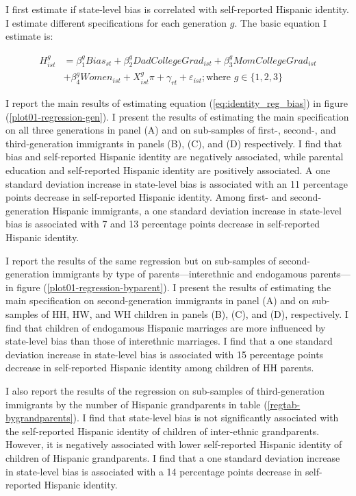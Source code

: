 \documentclass[12pt,english]{article}
\begin{document}
I first estimate if state-level bias is correlated with self-reported Hispanic identity. I estimate different specifications for each generation $g$. The basic equation I estimate is:
 
\begin{align}
H_{ist}^g &= \beta_1^g Bias_{st} + \beta_2^g DadCollegeGrad_{ist} + \beta_3^g MomCollegeGrad_{ist} \nonumber \\ 
            &+ \beta_4^g Women_{ist} + X_{ist}^g\pi + \gamma_{rt} 
           + \varepsilon_{ist}; 
           \text{where } g \in \{1,2,3\} \label{eq:identity_reg_bias}
\end{align}

I report the main results of estimating equation (\ref{eq:identity_reg_bias}) in figure (\ref{plot01-regression-gen}). I present the results of estimating the main specification on all three generations in panel (A) and on sub-samples of first-, second-, and third-generation immigrants in panels (B), (C), and (D) respectively. I find that bias and self-reported Hispanic identity are negatively associated, while parental education and self-reported Hispanic identity are positively associated. A one standard deviation increase in state-level bias is associated with an 11 percentage points decrease in self-reported Hispanic identity. Among first- and second-generation Hispanic immigrants, a one standard deviation increase in state-level bias is associated with 7 and 13 percentage points decrease in self-reported Hispanic identity.

I report the results of the same regression but on sub-samples of second-generation immigrants by type of parents---interethnic and endogamous parents---in figure (\ref{plot01-regression-byparent}). I present the results of estimating the main specification on second-generation immigrants in panel (A) and on sub-samples of HH, HW, and WH children in panels (B), (C), and (D), respectively. I find that children of endogamous Hispanic marriages are more influenced by state-level bias than those of interethnic marriages. I find that a one standard deviation increase in state-level bias is associated with 15 percentage points decrease in self-reported Hispanic identity among children of HH parents. 

I also report the results of the regression on sub-samples of third-generation immigrants by the number of Hispanic grandparents in table (\ref{regtab-bygrandparents}). I find that state-level bias is not significantly associated with the self-reported Hispanic identity of children of inter-ethnic grandparents. However, it is negatively associated with lower self-reported Hispanic identity of children of Hispanic grandparents. I find that a one standard deviation increase in state-level bias is associated with a 14 percentage points decrease in self-reported Hispanic identity.
\end{document}
